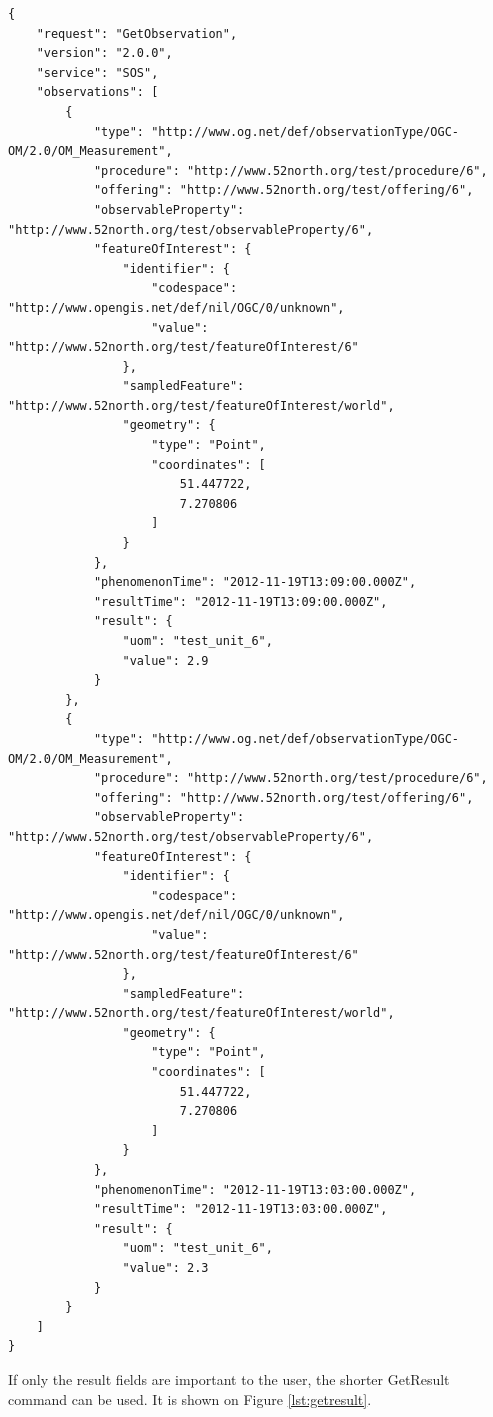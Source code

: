 \begin{lstlisting}[caption={JSON GetObservation response\label{lst:sendobs}}]
{
    "request": "GetObservation",
    "version": "2.0.0",
    "service": "SOS",
    "observations": [
        {
            "type": "http://www.og.net/def/observationType/OGC-OM/2.0/OM_Measurement",
            "procedure": "http://www.52north.org/test/procedure/6",
            "offering": "http://www.52north.org/test/offering/6",
            "observableProperty": "http://www.52north.org/test/observableProperty/6",
            "featureOfInterest": {
                "identifier": {
                    "codespace": "http://www.opengis.net/def/nil/OGC/0/unknown",
                    "value": "http://www.52north.org/test/featureOfInterest/6"
                },
                "sampledFeature": "http://www.52north.org/test/featureOfInterest/world",
                "geometry": {
                    "type": "Point",
                    "coordinates": [
                        51.447722,
                        7.270806
                    ]
                }
            },
            "phenomenonTime": "2012-11-19T13:09:00.000Z",
            "resultTime": "2012-11-19T13:09:00.000Z",
            "result": {
                "uom": "test_unit_6",
                "value": 2.9
            }
        },
        {
            "type": "http://www.og.net/def/observationType/OGC-OM/2.0/OM_Measurement",
            "procedure": "http://www.52north.org/test/procedure/6",
            "offering": "http://www.52north.org/test/offering/6",
            "observableProperty": "http://www.52north.org/test/observableProperty/6",
            "featureOfInterest": {
                "identifier": {
                    "codespace": "http://www.opengis.net/def/nil/OGC/0/unknown",
                    "value": "http://www.52north.org/test/featureOfInterest/6"
                },
                "sampledFeature": "http://www.52north.org/test/featureOfInterest/world",
                "geometry": {
                    "type": "Point",
                    "coordinates": [
                        51.447722,
                        7.270806
                    ]
                }
            },
            "phenomenonTime": "2012-11-19T13:03:00.000Z",
            "resultTime": "2012-11-19T13:03:00.000Z",
            "result": {
                "uom": "test_unit_6",
                "value": 2.3
            }
        }
    ]
}
\end{lstlisting}

If only the result fields are important to the user, the shorter GetResult command can be used. It is shown on Figure \ref{lst:getresult}.

